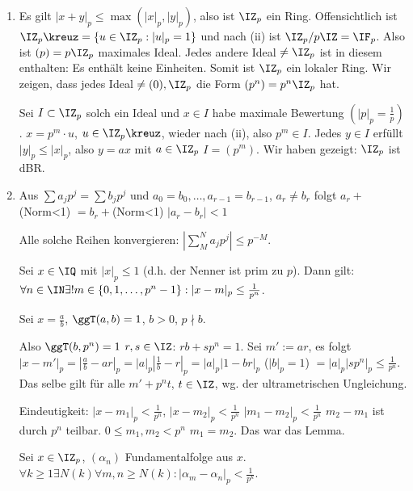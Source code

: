  \begin{Beweis}
 \begin{enumerate}
  \item Es gilt $|x+y|_p\leq \max(|x|_p,|y|_p)$, also ist $\IZ_p$ ein Ring. Offensichtlich ist $\IZ_p\kreuz=\{u\in\IZ_p : |u|_p=1\}$ und nach (ii) ist $\IZ_p/p\IZ=\IF_p$. Also ist $(p)=p\IZ_p$ maximales Ideal. Jedes andere Ideal $\neq \IZ_p$ ist in diesem enthalten: Es enthält keine Einheiten. Somit ist $\IZ_p$ ein lokaler Ring. Wir zeigen, dass jedes Ideal $\neq (0), \IZ_p$ die Form $(p^n)=p^n\IZ_p$ hat.
  
  Sei $I\subset\IZ_p$ solch ein Ideal und $x\in I$ habe maximale Bewertung $(|p|_p=\frac{1}{p})$. $x=p^m\cdot u$, $u\in\IZ_p\kreuz$, wieder nach (ii), also $p^m\in I$. Jedes $y\in I$ erfüllt $|y|_p\leq |x|_p$, also $y=ax$ mit $a\in\IZ_p$ \folge $I=(p^m)$. Wir haben gezeigt: $\IZ_p$ ist dBR.
  \item Aus $\sum a_jp^j=\sum b_jp^j$ und $a_0=b_0,\ldots,a_{r-1}=b_{r-1}$, $a_r\neq b_r$ folgt $a_r+$ (Norm<1) $= b_r + $(Norm<1) \folge $|a_r-b_r|<1$ \lightning  
  
  Alle solche Reihen konvergieren: $|\sum_{M}^Na_jp^j|\leq p^{-M}$.
  \begin{Lemma}
   Sei $x\in\IQ$ mit $|x|_p\leq 1$ (d.h. der Nenner ist prim zu $p$). Dann gilt: $\forall n\in\IN\exists! m\in\{0,1,\ldots,p^n-1\}:|x-m|_p\leq\frac{1}{p^n}$.
  \end{Lemma}
  \begin{Beweis}
    Sei $x=\frac{a}{b}$, $\ggT(a,b)=1$, $b>0$, $p\nmid b$.
  
    Also $\ggT(b,p^n)=1$ \folge $r,s\in\IZ$: $rb+sp^n=1$. Sei $m':=ar$, es folgt $|x-m'|_p=|\frac{a}{b}-ar|_p=|a|_p|\frac{1}{b}-r|_p=|a|_p|1-br|_p$ ($|b|_p=1$) $=|a|_p|sp^n|_p\leq\frac{1}{p^n}$.
    Das selbe gilt für alle $m'+p^nt$, $t\in\IZ$, wg. der ultrametrischen Ungleichung.
    
    Eindeutigkeit: $|x-m_1|_p<\frac{1}{p^n}$, $|x-m_2|_p<\frac{1}{p^n}$ \folge $|m_1-m_2|_p<\frac{1}{p^n}$ \folge $m_2-m_1$ ist durch $p^n$ teilbar. $0\leq m_1,m_2<p^n$ \folge $m_1=m_2$.
    Das war das Lemma.
  \end{Beweis}
  Sei $x\in\IZ_p$, $(\alpha_n)$ Fundamentalfolge aus $x$. $\forall k\geq 1\exists N(k)\forall m,n\geq N(k): |\alpha_m-\alpha_n|_p<\frac{1}{p^k}$.
  

\end{enumerate}
\end{Beweis}
